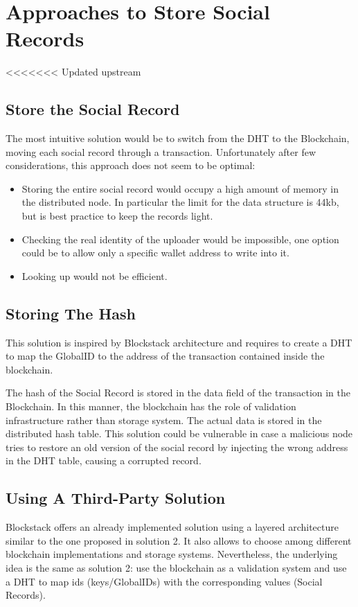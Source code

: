 \section{Approaches to Store Social Records}
<<<<<<< Updated upstream
\subsection{Store the Social Record}
The most intuitive solution would be to switch from the DHT to the Blockchain, moving each social record through a transaction. 
Unfortunately after few considerations, this approach does not seem to be optimal:
\begin{itemize}
	\item Storing the entire social record would occupy a high amount of memory in the distributed node. 
In particular the limit for the data structure is 44kb, but is best practice to keep the records light.
	\item Checking the real identity of the uploader would be impossible, one option could be to allow only a specific wallet address to write into it.
	\item Looking up would not be efficient.
\end{itemize}

\subsection{Storing The Hash}
This solution is inspired by Blockstack architecture and requires to create a DHT to map the GlobalID to the address of the transaction contained inside the blockchain.

The hash of the Social Record is stored in the data field of the transaction in the Blockchain. In this manner, the blockchain has the role of validation infrastructure rather than storage system. The actual data is stored in the distributed hash table. This solution could be vulnerable in case a malicious node tries to restore an old version of the social record by injecting the wrong address in the DHT table, causing a corrupted record.

\subsection{Using A Third-Party Solution}
Blockstack offers an already implemented solution using a layered architecture similar to the one proposed in solution 2. It also allows to choose among different blockchain implementations and storage systems. Nevertheless, the underlying idea is the same as solution 2: use the blockchain as a validation system and use a DHT to map ids (keys/GlobalIDs) with the corresponding values (Social Records).

